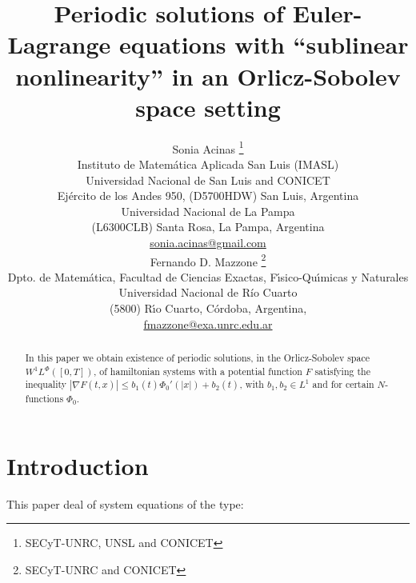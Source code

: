 \documentclass[twoside]{article}
\title{Periodic solutions of 
Euler-Lagrange equations with ``sublinear nonlinearity'' in an Orlicz-Sobolev space setting}
\author{Sonia Acinas \thanks{SECyT-UNRC, UNSL and CONICET}\\
Instituto de Matem\'atica Aplicada San Luis (IMASL)\\ 
Universidad Nacional de San Luis and CONICET\\
Ej\'ercito de los Andes 950,
(D5700HDW) San Luis, Argentina\\
Universidad Nacional de La Pampa\\
(L6300CLB) Santa Rosa, La Pampa, Argentina\\
\url{sonia.acinas@gmail.com}\\[3mm]
Fernando D. Mazzone \thanks{SECyT-UNRC and CONICET}\\
Dpto. de Matem\'atica, Facultad de Ciencias Exactas, F\'{\i}sico-Qu\'{\i}micas y Naturales\\
Universidad Nacional de R\'{i}o Cuarto\\
(5800) R\'{\i}o Cuarto, C\'ordoba, Argentina,\\
\url{fmazzone@exa.unrc.edu.ar}
}
\date{}
\theoremstyle{remark}
\newcommand{\lphi}{L^{\Phi}}
\newcommand{\wphi}{W^{1}\lphi}
\renewcommand{\leq}{\leqslant}
\begin{document}
\maketitle
%
\begingroup%
    \renewcommand{\thefootnote}{}%
    \endgroup
%
%
%
%

\begin{abstract}

In this paper we obtain existence of periodic solutions, in the Orlicz-Sobolev space $\wphi([0,T])$, of hamiltonian systems with a potential  function $F$ satisfying the inequality  $|\nabla F(t,x)|\leq b_1(t) \Phi_0'(|x|)+b_2(t)$, with    $b_1, b_2\in L^1$ and for certain $N$-functions $\Phi_0$.

\end{abstract}




\pagestyle{fancy} \headheight 35pt \fancyhead{} \fancyfoot{}

\fancyfoot[C]{\thepage}  \fancyhead[CO]{\nouppercase{\section}}

\fancyhead[CO]{\nouppercase{\leftmark}}






\section{Introduction}
This paper deal of system  equations of the type:
\end{document}

